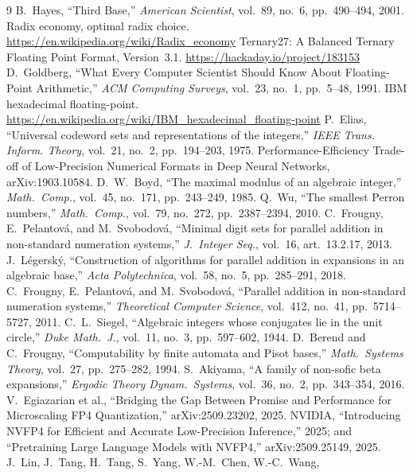 \documentclass[11pt]{article}
\theoremstyle{definition}
\begin{document}
\begin{thebibliography}{9}
 B.~Hayes, ``Third Base,'' \emph{American Scientist}, vol.~89, no.~6, pp.~490--494, 2001.
 Radix economy, optimal radix choice. \url{https://en.wikipedia.org/wiki/Radix_economy}
 Ternary27: A Balanced Ternary Floating Point Format, Version~3.1. \url{https://hackaday.io/project/183153}
 D.~Goldberg, ``What Every Computer Scientist Should Know About Floating-Point Arithmetic,'' \emph{ACM Computing Surveys}, vol.~23, no.~1, pp.~5--48, 1991.
 IBM hexadecimal floating-point. \url{https://en.wikipedia.org/wiki/IBM_hexadecimal_floating-point}
 P.~Elias, ``Universal codeword sets and representations of the integers,'' \emph{IEEE Trans. Inform. Theory}, vol.~21, no.~2, pp.~194--203, 1975.
 Performance-Efficiency Trade-off of Low-Precision Numerical Formats in Deep Neural Networks, arXiv:1903.10584.
 D.~W.~Boyd, ``The maximal modulus of an algebraic integer,''
\emph{Math.\ Comp.}, vol.~45, no.~171, pp.~243--249, 1985.
 Q.~Wu, ``The smallest Perron numbers,'' \emph{Math.\ Comp.},
vol.~79, no.~272, pp.~2387--2394, 2010.
 C.~Frougny, E.~Pelantov\'a, and M.~Svobodov\'a,
``Minimal digit sets for parallel addition in non-standard numeration systems,''
\emph{J.\ Integer Seq.}, vol.~16, art.~13.2.17, 2013.
 J.~L\'egersk\'y, ``Construction of algorithms for
parallel addition in expansions in an algebraic base,'' \emph{Acta
Polytechnica}, vol.~58, no.~5, pp.~285--291, 2018.
 C.~Frougny, E.~Pelantov\'a, and M.~Svobodov\'a,
``Parallel addition in non-standard numeration systems,'' \emph{Theoretical
Computer Science}, vol.~412, no.~41, pp.~5714--5727, 2011.
 C.~L.~Siegel, ``Algebraic integers whose conjugates lie in
the unit circle,'' \emph{Duke Math.\ J.}, vol.~11, no.~3, pp.~597--602, 1944.
 D.~Berend and C.~Frougny, ``Computability by finite automata
and Pisot bases,'' \emph{Math.\ Systems Theory}, vol.~27, pp.~275--282, 1994.
 S.~Akiyama, ``A family of non-sofic beta expansions,''
\emph{Ergodic Theory Dynam.\ Systems}, vol.~36, no.~2, pp.~343--354, 2016.
 V.~Egiazarian et al., ``Bridging the Gap Between Promise and
Performance for Microscaling FP4 Quantization,'' arXiv:2509.23202, 2025.
 NVIDIA, ``Introducing NVFP4 for Efficient and Accurate
Low-Precision Inference,'' 2025; and ``Pretraining Large Language Models with
NVFP4,'' arXiv:2509.25149, 2025.
 J.~Lin, J.~Tang, H.~Tang, S.~Yang, W.-M.~Chen, W.-C.~Wang,

\end{thebibliography}
\end{document}
